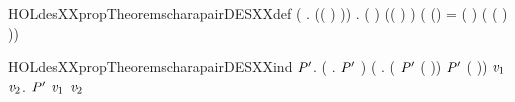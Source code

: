 \begin{SaveVerbatim}{HOLdesXXpropTheoremscharapairDESXXdef}
\HOLTokenTurnstile{} (\HOLSymConst{\HOLTokenForall{}} .     \HOLSymConst{=} (( \HOLSymConst{\HOLTokenExtract{}} ) \HOLSymConst{,}  )) \HOLSymConst{\HOLTokenConj{}}
   \HOLSymConst{\HOLTokenForall{}}  .
        ( ) \HOLSymConst{=}
        \HOLSymConst{=}   (( \HOLSymConst{\HOLTokenExtract{}} )  \HOLSymConst{\HOLTokenEor{}}   \HOLSymConst{,}  )
       (
          (\HOLSymConst{,}) =    ( \HOLSymConst{\ensuremath{-}} )
          ( \HOLSymConst{\HOLTokenEor{}}   \HOLSymConst{,} ( ) ))
\end{SaveVerbatim}
\newcommand{\HOLdesXXpropTheoremscharapairDESXXdef}{\UseVerbatim{HOLdesXXpropTheoremscharapairDESXXdef}}
\begin{SaveVerbatim}{HOLdesXXpropTheoremscharapairDESXXind}
\HOLTokenTurnstile{} \HOLSymConst{\HOLTokenForall{}}\ensuremath{\HOLBoundVar{P}\sp{\prime{}}}.
     (\HOLSymConst{\HOLTokenForall{}} . \ensuremath{\HOLBoundVar{P}\sp{\prime{}}}   ) \HOLSymConst{\HOLTokenConj{}}
     (\HOLSymConst{\HOLTokenForall{}}  . (  \HOLSymConst{\HOLTokenNotEqual{}}  \HOLSymConst{\HOLTokenImp{}} \ensuremath{\HOLBoundVar{P}\sp{\prime{}}}   ( \HOLSymConst{\ensuremath{-}} )) \HOLSymConst{\HOLTokenImp{}} \ensuremath{\HOLBoundVar{P}\sp{\prime{}}}   ( )) \HOLSymConst{\HOLTokenImp{}}
     \HOLSymConst{\HOLTokenForall{}} \ensuremath{\HOLBoundVar{v}\sb{\mathrm{1}}} \ensuremath{\HOLBoundVar{v}\sb{\mathrm{2}}}. \ensuremath{\HOLBoundVar{P}\sp{\prime{}}}  \ensuremath{\HOLBoundVar{v}\sb{\mathrm{1}}} \ensuremath{\HOLBoundVar{v}\sb{\mathrm{2}}}
\end{SaveVerbatim}
